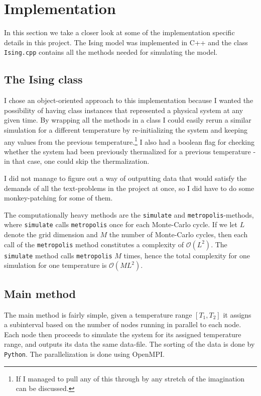 \section{Implementation}
\label{sec:implementation}

In this section we take a closer look at some of the implementation specific
details in this project. The Ising model was implemented in \textsc{C++} and
the class \texttt{Ising.cpp} contains all the methods needed for simulating the
model.

\subsection{The Ising class}
\label{sub:the_ising_class}
I chose an object-oriented approach to this implementation because I wanted the
possibility of having class instances that represented a physical system at any
given time. By wrapping all the methods in a class I could easily rerun a
similar simulation for a different temperature by re-initializing the system
and keeping any values from the previous temperature.\footnote{If I managed to
pull any of this through by any stretch of the imagination can be discussed.} I
also had a boolean flag for checking whether the system had been previously
thermalized for a previous temperature - in that case, one could skip the
thermalization.

I did not manage to figure out a way of outputting data that would satisfy the
demands of all the text-problems in the project at once, so I did have to do
some monkey-patching for some of them.

The computationally heavy methods are the \texttt{simulate} and
\texttt{metropolis}-methods, where \texttt{simulate} calls \texttt{metropolis}
once for each Monte-Carlo cycle. If we let $L$ denote the grid dimension and
$M$ the number of Monte-Carlo cycles, then each call of the \texttt{metropolis}
method constitutes a complexity of $\mathcal{O}(L^2)$. The \texttt{simulate}
method calls \texttt{metropolis} $M$ times, hence the total complexity for one
simulation for one temperature is $\mathcal{O}(ML^2)$.

\subsection{Main method}
\label{sub:main_method}
The main method is fairly simple, given a temperature range $[T_1, T_2]$ it
assigns a subinterval based on the number of nodes running in parallel to each
node. Each node then proceeds to simulate the system for its assigned
temperature range, and outputs its data the same data-file. The sorting of the
data is done by \texttt{Python}. The parallelization is done using OpenMPI.

